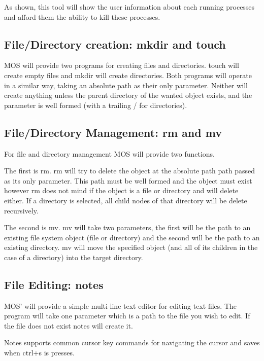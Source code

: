 \documentclass[a4paper]{report}
\begin{document}
As shown, this tool will show the user information about each running processes and afford them the ability to kill these processes.

\subsection{File/Directory creation: mkdir and touch}

MOS will provide two programs for creating files and directories. touch will create empty files and mkdir will create directories. Both programs will operate in a similar way, taking an absolute path as their only parameter. Neither will create anything unless the parent directory of the wanted object exists, and the parameter is well formed (with a trailing / for directories).

\subsection{File/Directory Management: rm and mv}

For file and directory management MOS will provide two functions.

The first is rm. rm will try to delete the object at the absolute path path passed as its only parameter. This path must be well formed and the object must exist however rm does not mind if the object is a file or directory and will delete either. If a directory is selected, all child nodes of that directory will be delete recursively.

The second is mv. mv will take two parameters, the first will be the path to an existing file system object (file or directory) and the second will be the path to an existing directory. mv will move the specified object (and all of its children in the case of a directory) into the target directory.

\subsection{File Editing: notes}

MOS' will provide a simple multi-line text editor for editing text files. The program will take one parameter which is a path to the file you wish to edit. If the file does not exist notes will create it.

Notes supports common cursor key commands for navigating the cursor and saves when ctrl+s is presses.
\end{document}
